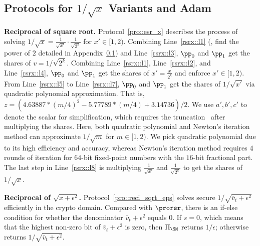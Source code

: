 \subsection{Protocols for \texorpdfstring{$1/\sqrt{x}$}{1/sqrt{x}} Variants and Adam}
\label{sec::sec_adam_app}

\noindent\textbf{Reciprocal of square root.}
Protocol~\ref{pro::esr_x} describes the process of solving $1/\sqrt{x}=\frac{1}{\sqrt{x'}}\cdot\frac{1}{\sqrt{2^k}}$ for $x'\in[1,2)$.
Combining Line~\ref{rsrx::l1} (\ie, find the power of $2$ detailed in Appendix~\ref{sec::sec_adam_app}) and Line~\ref{rsrx::l3},  $\pp_0$ and $\pp_1$ get the shares of $v={1}/{\sqrt{2^k}}$.
Combining Line~\ref{rsrx::l1}, Line~\ref{rsrx::l2}, and Line~\ref{rsrx::l4}, $\pp_0$ and $\pp_1$ get the shares of $x'=\frac{x}{2^k}$ and enforce $x'\in [1,2)$.
From Line~\ref{rsrx::l5} to Line~\ref{rsrx::l7}, $\pp_0$ and $\pp_1$ get the shares of $1/\sqrt{x'}$ via quadratic polynomial approximation.
That is, $z= (4.63887*(m/4)^2 - 5.77789*(m/4) + 3.14736)/2$.
We use $a', b', c'$ to denote the scalar for simplification, which requires the truncation~\cite{sp/MohasselZ17} after multiplying the shares.
Here, both quadratic polynomial and Newton's iteration method can approximate $1/\sqrt{m}$ for $m\in[1,2)$.
We pick quadratic polynomial due to its high efficiency and accuracy, whereas Newton's iteration method requires $4$ rounds of iteration for $64$-bit fixed-point numbers with the $16$-bit fractional part.
The last step in Line~\ref{rsrx::l8} is multiplying $\frac{1}{\sqrt{x'}}$ and $\frac{1}{\sqrt{2^k}}$ to get the shares of $1/\sqrt{x}$.






\noindent\textbf{Reciprocal of $\sqrt{x+\epsilon^2}$.}
Protocol~\ref{pro::reci_sqrt_eps} solves secure ${1}/{\sqrt{\bar{v}_t+\epsilon^2}}$ efficiently in the crypto domain.
Compared with $\prorsr$, there is an if-else condition for whether the denominator $\bar{v}_t+ \epsilon ^2$ equals $0$.
If $s=0$, which means that the highest non-zero bit of $\bar{v}_t+\epsilon^2$ is zero, then $\Pi_\SM$ returns $1/\epsilon$; otherwise returns $1/{\sqrt{\bar{v}_t+\epsilon^2}}$.


